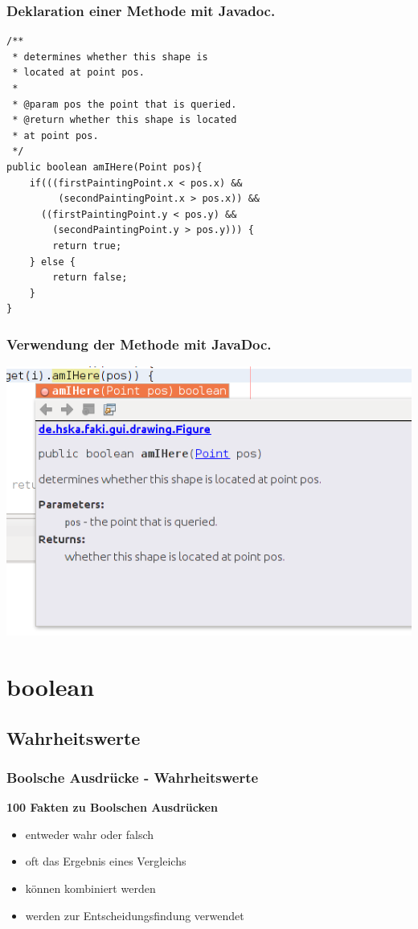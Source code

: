 \documentclass[final]{beamer}
\begin{document}
\begin{frame}[containsverbatim]
	\frametitle{Deklaration einer Methode mit Javadoc.}
	\begin{lstlisting}
/**
 * determines whether this shape is
 * located at point pos.
 *
 * @param pos the point that is queried.
 * @return whether this shape is located
 * at point pos.
 */
public boolean amIHere(Point pos){
	if(((firstPaintingPoint.x < pos.x) &&
		 (secondPaintingPoint.x > pos.x)) &&
	  ((firstPaintingPoint.y < pos.y) &&
		(secondPaintingPoint.y > pos.y))) {
		return true;
	} else {
		return false;
	}
}
	\end{lstlisting}
\end{frame}

\begin{frame}
	\frametitle{Verwendung der Methode mit JavaDoc.}
	\includegraphics[scale=0.5]{JavaDoc_example_2_1.png}
\end{frame}

\section{boolean}
\subsection{Wahrheitswerte}
\begin{frame}
	\frametitle{Boolsche Ausdrücke - Wahrheitswerte}
	\textbf{100 Fakten zu Boolschen Ausdrücken}
	\begin{itemize}
		\item{entweder wahr oder falsch}
		\item{oft das Ergebnis eines Vergleichs}
		\item{können kombiniert werden}
		\item{werden zur Entscheidungsfindung verwendet}
	\end{itemize}
\end{frame}
\end{document}
